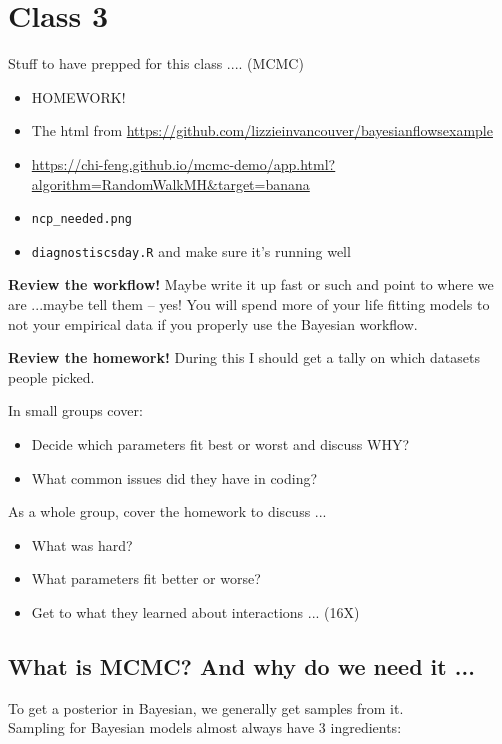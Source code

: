 \documentclass[11pt]{article}
\begin{document}
\newpage
\section{Class 3} 

Stuff to have prepped for this class .... (MCMC) 
\begin{itemize}
\item HOMEWORK!
\item The html from \url{https://github.com/lizzieinvancouver/bayesianflowsexample}
\item \url{https://chi-feng.github.io/mcmc-demo/app.html?algorithm=RandomWalkMH&target=banana}
\item \verb|ncp_needed.png|
\item \verb|diagnostiscsday.R| and make sure it's running well
\end{itemize}

{\bf Review the workflow!} Maybe write it up fast or such and point to where we are ...maybe tell them -- yes! You will spend more of your life fitting models to not your empirical data if you properly use the Bayesian workflow.

{\bf Review the homework!} 
  During this I should get a tally on which datasets people picked.

In small groups cover:
\begin{itemize}
\item Decide which parameters fit best or worst and discuss WHY?
\item What common issues did they have in coding?
\end{itemize}

As a whole group, cover the homework to discuss ... 
\begin{itemize}
\item What was hard? 
\item What parameters fit better or worse? 
\item Get to what they learned about interactions ... (16X)
\end{itemize}

\subsection{What is MCMC? And why do we need it ...}

To get a posterior in Bayesian, we generally get samples from it. \\
Sampling for Bayesian models almost always have 3 ingredients:
\end{document}
